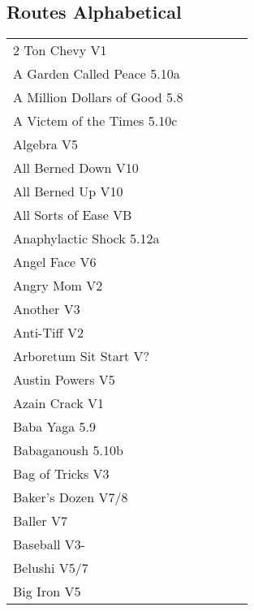 \begin{flushleft}

\needspace{1.5cm}
\section{Routes Alphabetical}
\begin{center}
\begin{supertabular}{p{0.76\linewidth}p{0.08\linewidth}}
2 Ton Chevy V1 & \pageref{rt:2 Ton Chevy} \\
A Garden Called Peace 5.10a & \pageref{rt:A Garden Called Peace} \\
A Million Dollars of Good 5.8 & \pageref{rt:A Million Dollars of Good} \\
A Victem of the Times 5.10c & \pageref{vr:A Victem of the Times} \\
Algebra V5 & \pageref{rt:Algebra} \\
All Berned Down V10 & \pageref{rt:All Berned Down} \\
All Berned Up V10 & \pageref{rt:All Berned Up} \\
All Sorts of Ease VB & \pageref{rt:All Sorts of Ease} \\
Anaphylactic Shock 5.12a & \pageref{rt:Anaphylactic Shock} \\
Angel Face V6 & \pageref{rt:Angel Face} \\
Angry Mom V2 & \pageref{rt:Angry Mom} \\
Another V3 & \pageref{rt:Another} \\
Anti-Tiff V2 & \pageref{rt:Anti-Tiff} \\
Arboretum Sit Start V? & \pageref{vr:Arboretum Sit Start} \\
Austin Powers V5 & \pageref{rt:Austin Powers} \\
Azain Crack V1 & \pageref{vr:Azain Crack} \\
Baba Yaga 5.9 & \pageref{rt:Baba Yaga} \\
Babaganoush 5.10b & \pageref{rt:Babaganoush} \\
Bag of Tricks V3 & \pageref{vr:Bag of Tricks} \\
Baker's Dozen V7/8 & \pageref{vr:Baker's Dozen} \\
Baller V7 & \pageref{vr:Baller} \\
Baseball V3- & \pageref{rt:Baseball} \\
Belushi V5/7 & \pageref{rt:Belushi} \\
Big Iron V5 & \pageref{rt:Big Iron} \\

\end{supertabular}
\end{center}
\end{flushleft}
